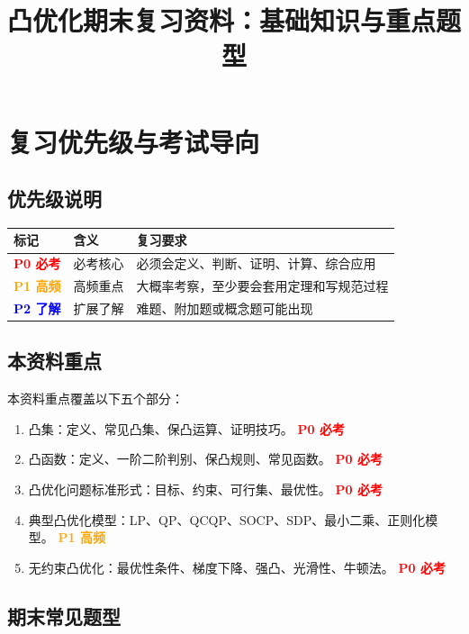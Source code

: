 \documentclass[11pt,a4paper]{ctexart}
\title{\textbf{凸优化期末复习资料：基础知识与重点题型}}
\author{}
\date{}
\newcommand{\Pzero}{\textcolor{red}{\textbf{P0 必考}}}
\newcommand{\Pone}{\textcolor{orange}{\textbf{P1 高频}}}
\newcommand{\Ptwo}{\textcolor{blue}{\textbf{P2 了解}}}
\theoremstyle{definition}
\theoremstyle{plain}
\theoremstyle{remark}
\begin{document}
\maketitle
\tableofcontents
\newpage

\section{复习优先级与考试导向}

\subsection*{优先级说明}

\begin{center}
\begin{tabular}{lll}
\toprule
标记 & 含义 & 复习要求 \\
\midrule
\Pzero & 必考核心 & 必须会定义、判断、证明、计算、综合应用 \\
\Pone & 高频重点 & 大概率考察，至少要会套用定理和写规范过程 \\
\Ptwo & 扩展了解 & 难题、附加题或概念题可能出现 \\
\bottomrule
\end{tabular}
\end{center}

\subsection*{本资料重点}

本资料重点覆盖以下五个部分：

\begin{enumerate}[label=\arabic*.]
    \item 凸集：定义、常见凸集、保凸运算、证明技巧。 \Pzero
    \item 凸函数：定义、一阶二阶判别、保凸规则、常见函数。 \Pzero
    \item 凸优化问题标准形式：目标、约束、可行集、最优性。 \Pzero
    \item 典型凸优化模型：LP、QP、QCQP、SOCP、SDP、最小二乘、正则化模型。 \Pone
    \item 无约束凸优化：最优性条件、梯度下降、强凸、光滑性、牛顿法。 \Pzero
\end{enumerate}

\subsection*{期末常见题型}
\end{document}
